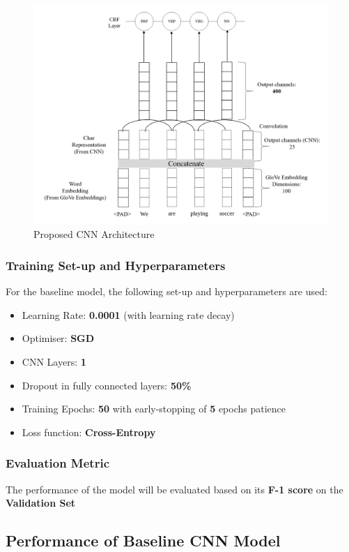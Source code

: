 \documentclass[sigconf,nonacm=true]{acmart}
\begin{document}
\begin{figure}[H]
	\centering
	\includegraphics[scale=0.345]{figures/cnn.png}
	\caption{Proposed CNN Architecture}
	\label{fig:cnnarch}
\end{figure}

\subsubsection{Training Set-up and Hyperparameters} \label{subsubsection:baselinesetup}
For the baseline model, the following set-up and hyperparameters are used:
\begin{itemize}
	\item Learning Rate: \textbf{0.0001} (with learning rate decay)
	\item Optimiser: \textbf{SGD}
	\item CNN Layers: \textbf{1}
	\item Dropout in fully connected layers: \textbf{50\%}
	\item Training Epochs: \textbf{50} with early-stopping of \textbf{5} epochs patience
	\item Loss function: \textbf{Cross-Entropy}
\end{itemize}

\subsubsection{Evaluation Metric}
The performance of the model will be evaluated based on its \textbf{F-1 score} on the \textbf{Validation Set}

\subsection{Performance of Baseline CNN Model}
\end{document}
